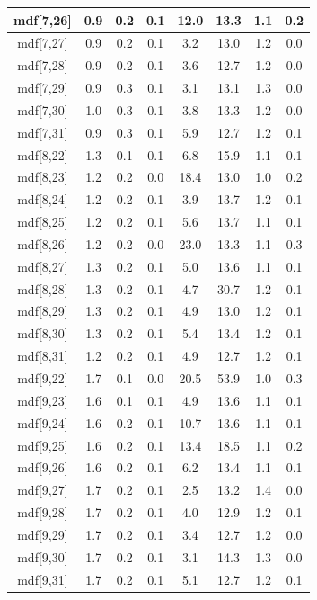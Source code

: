 \begin{longtable}{|c|c|c|c|c|c|c|c|}
\hline
mdf[7,26] & 0.9 & 0.2 & 0.1 & 12.0 & 13.3 & 1.1 & 0.2 \\
\hline
mdf[7,27] & 0.9 & 0.2 & 0.1 & 3.2 & 13.0 & 1.2 & 0.0 \\
\hline
mdf[7,28] & 0.9 & 0.2 & 0.1 & 3.6 & 12.7 & 1.2 & 0.0 \\
\hline
mdf[7,29] & 0.9 & 0.3 & 0.1 & 3.1 & 13.1 & 1.3 & 0.0 \\
\hline
mdf[7,30] & 1.0 & 0.3 & 0.1 & 3.8 & 13.3 & 1.2 & 0.0 \\
\hline
mdf[7,31] & 0.9 & 0.3 & 0.1 & 5.9 & 12.7 & 1.2 & 0.1 \\
\hline
mdf[8,22] & 1.3 & 0.1 & 0.1 & 6.8 & 15.9 & 1.1 & 0.1 \\
\hline
mdf[8,23] & 1.2 & 0.2 & 0.0 & 18.4 & 13.0 & 1.0 & 0.2 \\
\hline
mdf[8,24] & 1.2 & 0.2 & 0.1 & 3.9 & 13.7 & 1.2 & 0.1 \\
\hline
mdf[8,25] & 1.2 & 0.2 & 0.1 & 5.6 & 13.7 & 1.1 & 0.1 \\
\hline
mdf[8,26] & 1.2 & 0.2 & 0.0 & 23.0 & 13.3 & 1.1 & 0.3 \\
\hline
mdf[8,27] & 1.3 & 0.2 & 0.1 & 5.0 & 13.6 & 1.1 & 0.1 \\
\hline
mdf[8,28] & 1.3 & 0.2 & 0.1 & 4.7 & 30.7 & 1.2 & 0.1 \\
\hline
mdf[8,29] & 1.3 & 0.2 & 0.1 & 4.9 & 13.0 & 1.2 & 0.1 \\
\hline
mdf[8,30] & 1.3 & 0.2 & 0.1 & 5.4 & 13.4 & 1.2 & 0.1 \\
\hline
mdf[8,31] & 1.2 & 0.2 & 0.1 & 4.9 & 12.7 & 1.2 & 0.1 \\
\hline
mdf[9,22] & 1.7 & 0.1 & 0.0 & 20.5 & 53.9 & 1.0 & 0.3 \\
\hline
mdf[9,23] & 1.6 & 0.1 & 0.1 & 4.9 & 13.6 & 1.1 & 0.1 \\
\hline
mdf[9,24] & 1.6 & 0.2 & 0.1 & 10.7 & 13.6 & 1.1 & 0.1 \\
\hline
mdf[9,25] & 1.6 & 0.2 & 0.1 & 13.4 & 18.5 & 1.1 & 0.2 \\
\hline
mdf[9,26] & 1.6 & 0.2 & 0.1 & 6.2 & 13.4 & 1.1 & 0.1 \\
\hline
mdf[9,27] & 1.7 & 0.2 & 0.1 & 2.5 & 13.2 & 1.4 & 0.0 \\
\hline
mdf[9,28] & 1.7 & 0.2 & 0.1 & 4.0 & 12.9 & 1.2 & 0.1 \\
\hline
mdf[9,29] & 1.7 & 0.2 & 0.1 & 3.4 & 12.7 & 1.2 & 0.0 \\
\hline
mdf[9,30] & 1.7 & 0.2 & 0.1 & 3.1 & 14.3 & 1.3 & 0.0 \\
\hline
mdf[9,31] & 1.7 & 0.2 & 0.1 & 5.1 & 12.7 & 1.2 & 0.1 \\

\end{longtable}
